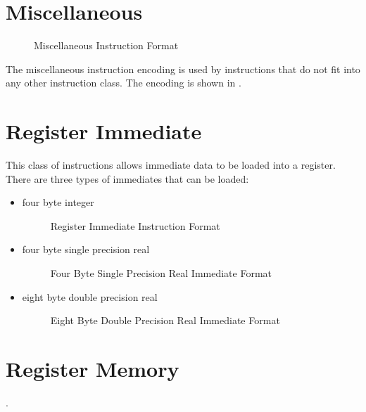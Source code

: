 \section{Miscellaneous}

\begin{figure}[h]
  \centering
{}\usebox{\mtypebox}
    \caption{Miscellaneous Instruction Format}
    \label{fig:misc-format}
\end{figure}

The miscellaneous instruction encoding is used by instructions that do
not fit into any other instruction class.  The encoding is shown in
.


\section{Register Immediate}


This class of instructions allows immediate data to be loaded into a
register.  There are three types of immediates that can be loaded:

\begin{itemize}
\item four byte integer
  \begin{figure}[h!]
    \centering
      \usebox{\regmemtypebox}
      \caption{Register Immediate Instruction Format}
  \end{figure}

\item four byte single precision real

  \begin{figure}[h!]
    \centering
      \usebox{\regmemimmfloattypebox}
      \caption{Four Byte Single Precision Real Immediate Format}
      \label{fig:four-byte-float-format}
  \end{figure}

\item eight byte double precision real
  \begin{figure}[h!]
    \centering
      \usebox{\regmemimmdoubletypebox}
      \caption{Eight Byte Double Precision Real Immediate Format}
      \label{fig:eight-byte-float-format}
  \end{figure}
\end{itemize}

\section{Register Memory}\label{sect:register-memory}.

